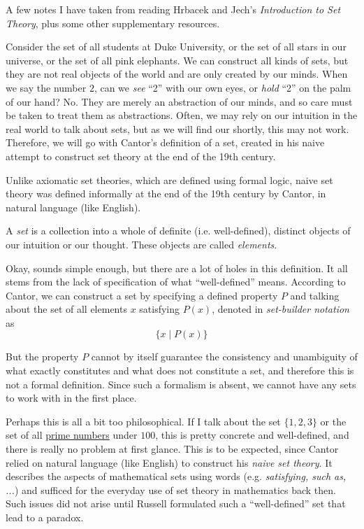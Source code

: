 A few notes I have taken from reading Hrbacek and Jech's \textit{Introduction to Set Theory}, plus some other supplementary resources. 

Consider the set of all students at Duke University, or the set of all stars in our universe, or the set of all pink elephants. We can construct all kinds of sets, but they are not real objects of the world and are only created by our minds. When we say the number $2$, can we \textit{see} ``2'' with our own eyes, or \textit{hold} ``2'' on the palm of our hand? No. They are merely an abstraction of our minds, and so care must be taken to treat them as abstractions. Often, we may rely on our intuition in the real world to talk about sets, but as we will find our shortly, this may not work. Therefore, we will go with Cantor's definition of a set, created in his naive attempt  to construct set theory at the end of the 19th century. 

Unlike axiomatic set theories, which are defined using formal logic, naive set theory was defined informally at the end of the 19th century by Cantor, 
in natural language (like English). 

\begin{definition}[Cantor]
  \label{def:cantor}
  A \textit{set} is a collection into a whole of definite (i.e. well-defined), distinct objects of our intuition or our thought. These objects are called \textit{elements}. 
\end{definition}

Okay, sounds simple enough, but there are a lot of holes in this definition. It all stems from the lack of specification of what ``well-defined'' means. According to Cantor, we can construct a set by specifying a defined property $P$ and talking about the set of all elements $x$ satisfying $P(x)$, denoted in \textit{set-builder notation} as 
\begin{equation}
  \{x \mid P(x)\}
\end{equation}

But the property $P$ cannot by itself guarantee the consistency and unambiguity of what exactly constitutes and what does not constitute a set, and therefore this is not a formal definition. Since such a formalism is absent, we cannot have any sets to work with in the first place. 

Perhaps this is all a bit too philosophical. If I talk about the set $\{1, 2, 3\}$ or the set of all \hyperref[real-thm:prime-number-theorem]{prime numbers} under $100$, this is pretty concrete and well-defined, and there is really no problem at first glance. This is to be expected, since Cantor relied on natural language (like English) to construct his \textit{naive set theory}. It describes the aspects of mathematical sets using words (e.g. \textit{satisfying, such as, ...}) and sufficed for the everyday use of set theory in mathematics back then. Such issues did not arise until Russell formulated such a ``well-defined'' set that lead to a paradox. 

